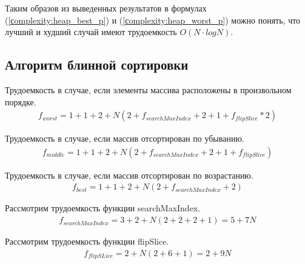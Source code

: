 Таким образов из выведенных результатов в формулах (\ref{сomplexity:heap_best_p}) и (\ref{сomplexity:heap_worst_p}) можно понять, что лучший и худший случай имеют трудоемкость $O(N \cdot log N)$.

\subsection{Алгоритм блинной сортировки}

Трудоемкость в случае, если элементы массива расположены в произвольном порядке.
\begin{equation}
    \label{сomplexity:pancake1}
    \begin{gathered}
        f_{worst} = 1 + 1 + 2 + N(2 + f_{searchMaxIndex} + 2 + 1 + f_{flipSlice} * 2)
    \end{gathered}
\end{equation}

Трудоемкость в случае, если массив отсортирован по убыванию.
\begin{equation}
    \label{сomplexity:pancake2}
    \begin{gathered}
        f_{middle} = 1 + 1 + 2 + N(2 + f_{searchMaxIndex} + 2 + 1 + f_{flipSlice})
    \end{gathered}
\end{equation}

Трудоемкость в случае, если массив отсортирован по возрастанию.
\begin{equation}
    \label{сomplexity:pancake3}
    \begin{gathered}
        f_{best} = 1 + 1 + 2 + N(2 + f_{searchMaxIndex} + 2)
    \end{gathered}
\end{equation}

Рассмотрим трудоемкость функции searchMaxIndex.
\begin{equation}
    \label{сomplexity:searchMaxIndex}
    \begin{gathered}
        f_{searchMaxIndex} = 3 + 2 + N(2 + 2 + 2 + 1) = 5 + 7N
    \end{gathered}
\end{equation}

Рассмотрим трудоемкость функции flipSlice.
\begin{equation}
    \label{сomplexity:flipSlice}
    \begin{gathered}
        f_{flipSLice} = 2 + N(2 + 6 + 1) = 2 + 9N
    \end{gathered}
\end{equation}

